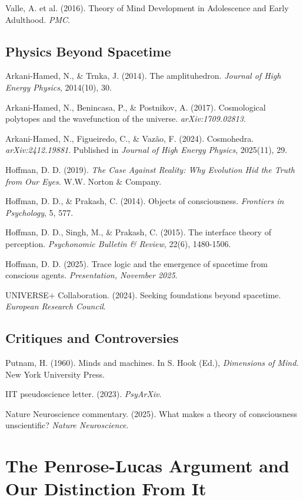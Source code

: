 \documentclass[12pt,a4paper]{article}
\begin{document}
Valle, A. et al. (2016). Theory of Mind Development in Adolescence and Early Adulthood. \textit{PMC}.

\subsection*{Physics Beyond Spacetime}

Arkani-Hamed, N., \& Trnka, J. (2014). The amplituhedron. \textit{Journal of High Energy Physics}, 2014(10), 30.

Arkani-Hamed, N., Benincasa, P., \& Postnikov, A. (2017). Cosmological polytopes and the wavefunction of the universe. \textit{arXiv:1709.02813}.

Arkani-Hamed, N., Figueiredo, C., \& Vaz\~{a}o, F. (2024). Cosmohedra. \textit{arXiv:2412.19881}. Published in \textit{Journal of High Energy Physics}, 2025(11), 29.

Hoffman, D. D. (2019). \textit{The Case Against Reality: Why Evolution Hid the Truth from Our Eyes}. W.W. Norton \& Company.

Hoffman, D. D., \& Prakash, C. (2014). Objects of consciousness. \textit{Frontiers in Psychology}, 5, 577.

Hoffman, D. D., Singh, M., \& Prakash, C. (2015). The interface theory of perception. \textit{Psychonomic Bulletin \& Review}, 22(6), 1480-1506.

Hoffman, D. D. (2025). Trace logic and the emergence of spacetime from conscious agents. \textit{Presentation, November 2025}.

UNIVERSE+ Collaboration. (2024). Seeking foundations beyond spacetime. \textit{European Research Council}.

\subsection*{Critiques and Controversies}

Putnam, H. (1960). Minds and machines. In S. Hook (Ed.), \textit{Dimensions of Mind}. New York University Press.

IIT pseudoscience letter. (2023). \textit{PsyArXiv}.

Nature Neuroscience commentary. (2025). What makes a theory of consciousness unscientific? \textit{Nature Neuroscience}.

\appendix

\section{The Penrose-Lucas Argument and Our Distinction From It}
\end{document}
